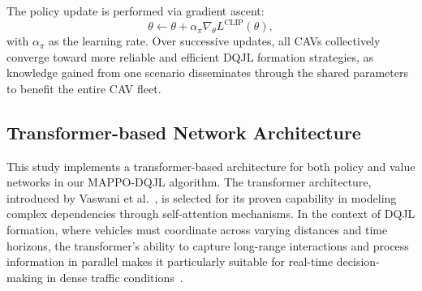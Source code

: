The policy update is performed via gradient ascent:
\[
\theta \gets \theta + \alpha_{\pi} \nabla_{\theta} L^{\text{CLIP}}(\theta),
\]
with \(\alpha_{\pi}\) as the learning rate. Over successive updates, all CAVs collectively converge toward more reliable and efficient DQJL formation strategies, as knowledge gained from one scenario disseminates through the shared parameters to benefit the entire CAV fleet.


\subsection{Transformer-based Network Architecture}
\label{subsec:network_architecture}
This study implements a transformer-based architecture for both policy and value networks in our MAPPO-DQJL algorithm. The transformer architecture, introduced by Vaswani et al.~\cite{vaswani2017attention}, is selected for its proven capability in modeling complex dependencies through self-attention mechanisms. In the context of DQJL formation, where vehicles must coordinate across varying distances and time horizons, the transformer's ability to capture long-range interactions and process information in parallel makes it particularly suitable for real-time decision-making in dense traffic conditions~\cite{parisotto2020stabilizing,chen2021decision}.

